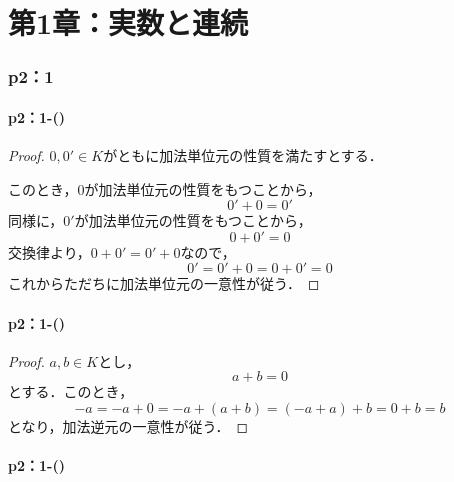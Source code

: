 
\part*{第1章：実数と連続}

\section*{p2：1}


\subsection*{p2：1-()}

\begin{leftbar}
    \begin{proof}
        $0,0' \in K$がともに加法単位元の性質を満たすとする．

        このとき，$0$が加法単位元の性質をもつことから，
        \[
            0'+0=0'
        \]
        同様に，$0'$が加法単位元の性質をもつことから，
        \[
            0+0' = 0
        \]
        交換律より，$0+0'=0'+0$なので，
        \[
            0'=0'+0 =0+0' =0
        \]
        これからただちに加法単位元の一意性が従う．
    \end{proof}
\end{leftbar}

\subsection*{p2：1-()}

\begin{leftbar}
    \begin{proof}
        $a ,b \in K$とし，
        \[
            a+b =0
        \]
        とする．このとき，
        \[
            -a = -a+0 = -a +(a+b)=(-a+a)+b =0+b = b
        \]
        となり，加法逆元の一意性が従う．
    \end{proof}
\end{leftbar}

\subsection*{p2：1-()}

